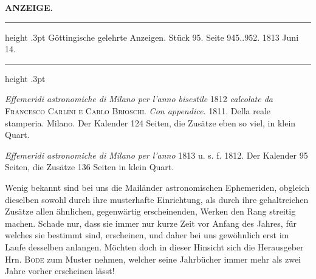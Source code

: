 \clearpage
\thispagestyle{empty}
\noindent{}%
%
\parbox[t]{\dimexpr\linewidth-24mm\relax}{\centering\footnotesize\bfseries ANZEIGE.\par}%
\makebox[12mm][r]{}\par\medskip
\begin{center}
\parbox{.84\linewidth}{%
\centering\small
\hrule height .3pt\relax\vspace{2.5pt}
Göttingische gelehrte Anzeigen. Stück 95. Seite 945..952. 1813 Juni 14.\par
\vspace{2.5pt}\hrule height .3pt\relax
}
\end{center}

\emph{Effemeridi astronomiche di Milano per l'anno bisestile} 1812 \emph{calcolate da} \textsc{Francesco Carlini e Carlo Brioschi}. \emph{Con appendice.} 1811. Della reale stamperia. Milano. Der Kalender 124 Seiten, die Zusätze eben so viel, in klein Quart.

\emph{Effemeridi astronomiche di Milano per l'anno} 1813 u. s. f. 1812. Der Kalender 95 Seiten, die Zusätze 136 Seiten in klein Quart.

Wenig bekannt sind bei uns die Mailänder astronomischen Ephemeriden, obgleich dieselben sowohl durch ihre musterhafte Einrichtung, als durch ihre gehaltreichen Zusätze allen ähnlichen, gegenwärtig erscheinenden, Werken den Rang streitig machen. Schade nur, dass sie immer nur kurze Zeit vor Anfang des Jahres, für welches sie bestimmt sind, erscheinen, und daher bei uns gewöhnlich erst im Laufe desselben anlangen. Möchten doch in dieser Hinsicht sich die Herausgeber Hrn. \textsc{Bode} zum Muster nehmen, welcher seine Jahrbücher immer mehr als zwei Jahre vorher erscheinen lässt!


